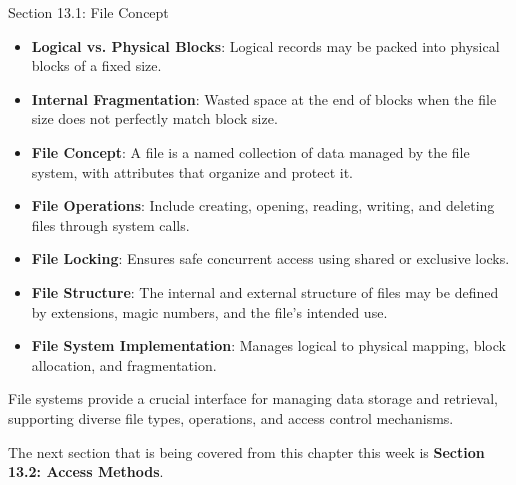 \begin{notes}{Section 13.1: File Concept}
    \begin{highlight}
    
        \begin{itemize}
            \item \textbf{Logical vs. Physical Blocks}: Logical records may be packed into physical blocks of a fixed size.
            \item \textbf{Internal Fragmentation}: Wasted space at the end of blocks when the file size does not perfectly match block size.
        \end{itemize}
    
    \end{highlight}
    
    \begin{highlight}
    
        \begin{itemize}
            \item \textbf{File Concept}: A file is a named collection of data managed by the file system, with attributes that organize and protect it.
            \item \textbf{File Operations}: Include creating, opening, reading, writing, and deleting files through system calls.
            \item \textbf{File Locking}: Ensures safe concurrent access using shared or exclusive locks.
            \item \textbf{File Structure}: The internal and external structure of files may be defined by extensions, magic numbers, and the file's intended use.
            \item \textbf{File System Implementation}: Manages logical to physical mapping, block allocation, and fragmentation.
        \end{itemize}
    
    File systems provide a crucial interface for managing data storage and retrieval, supporting diverse file types, operations, and access control mechanisms.
    
    \end{highlight}
\end{notes}

The next section that is being covered from this chapter this week is \textbf{Section 13.2: Access Methods}.

